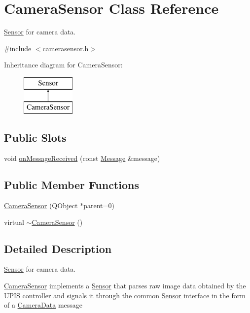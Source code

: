 \hypertarget{classCameraSensor}{
\section{CameraSensor Class Reference}
\label{classCameraSensor}
}


\hyperlink{classSensor}{Sensor} for camera data.  




{\ttfamily \#include $<$camerasensor.h$>$}

Inheritance diagram for CameraSensor:\begin{figure}[H]
\begin{center}
\leavevmode
\includegraphics[height=2.000000cm]{classCameraSensor}
\end{center}
\end{figure}
\subsection*{Public Slots}
\begin{DoxyCompactItemize}
\item 
void \hyperlink{classCameraSensor_a7ac39be83c8f461b0d6e057d8b2d4011}{onMessageReceived} (const \hyperlink{classMessage}{Message} \&message)
\end{DoxyCompactItemize}
\subsection*{Public Member Functions}
\begin{DoxyCompactItemize}
\item 
\hyperlink{classCameraSensor_a0aed1ea5c345d9c964ec91ce35448e49}{CameraSensor} (QObject $\ast$parent=0)
\item 
virtual \hyperlink{classCameraSensor_ad55bb359dcb32fef636013e960e45a34}{$\sim$CameraSensor} ()
\end{DoxyCompactItemize}


\subsection{Detailed Description}
\hyperlink{classSensor}{Sensor} for camera data. 

\hyperlink{classCameraSensor}{CameraSensor} implements a \hyperlink{classSensor}{Sensor} that parses raw image data obtained by the UPIS controller and signals it through the common \hyperlink{classSensor}{Sensor} interface in the form of a \hyperlink{classCameraData}{CameraData} message

